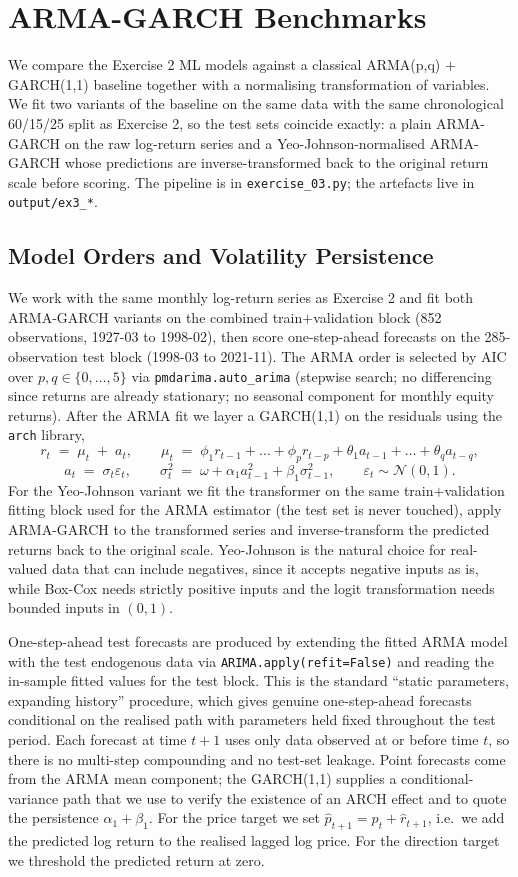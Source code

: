 \documentclass[12pt,a4paper]{article}
\newcommand{\probsection}[2]{\section{#2}}
\newcommand{\probsub}[2]{\subsection{#2}}
\newcommand{\code}[1]{\texttt{#1}}
\begin{document}
\probsection{3}{ARMA-GARCH Benchmarks}

We compare the Exercise 2 ML models against a classical ARMA(p,q) $+$ GARCH(1,1) baseline together with a normalising transformation of variables. We fit two variants of the baseline on the same data with the same chronological 60/15/25 split as Exercise 2, so the test sets coincide exactly: a plain ARMA-GARCH on the raw log-return series and a Yeo-Johnson-normalised ARMA-GARCH whose predictions are inverse-transformed back to the original return scale before scoring. The pipeline is in \code{exercise\_03.py}; the artefacts live in \code{output/ex3\_*}.

\probsub{3a}{Model Orders and Volatility Persistence}

We work with the same monthly log-return series as Exercise 2 and fit both ARMA-GARCH variants on the combined train$+$validation block (852 observations, 1927-03 to 1998-02), then score one-step-ahead forecasts on the 285-observation test block (1998-03 to 2021-11). The ARMA order is selected by AIC over $p, q \in \{0, \dots, 5\}$ via \code{pmdarima.auto\_arima} (stepwise search; no differencing since returns are already stationary; no seasonal component for monthly equity returns). After the ARMA fit we layer a GARCH(1,1) on the residuals using the \code{arch} library,
\[
r_t \;=\; \mu_t \;+\; a_t,\qquad
\mu_t \;=\; \phi_1 r_{t-1} + \dots + \phi_p r_{t-p} + \theta_1 a_{t-1} + \dots + \theta_q a_{t-q},
\]
\[
a_t \;=\; \sigma_t \varepsilon_t,\qquad
\sigma_t^2 \;=\; \omega + \alpha_1 a_{t-1}^2 + \beta_1 \sigma_{t-1}^2,\qquad \varepsilon_t \sim \mathcal{N}(0, 1).
\]
For the Yeo-Johnson variant we fit the transformer on the same train$+$validation fitting block used for the ARMA estimator (the test set is never touched), apply ARMA-GARCH to the transformed series and inverse-transform the predicted returns back to the original scale. Yeo-Johnson is the natural choice for real-valued data that can include negatives, since it accepts negative inputs as is, while Box-Cox needs strictly positive inputs and the logit transformation needs bounded inputs in $(0,1)$.

One-step-ahead test forecasts are produced by extending the fitted ARMA model with the test endogenous data via \code{ARIMA.apply(refit=False)} and reading the in-sample fitted values for the test block. This is the standard ``static parameters, expanding history'' procedure, which gives genuine one-step-ahead forecasts conditional on the realised path with parameters held fixed throughout the test period. Each forecast at time $t+1$ uses only data observed at or before time $t$, so there is no multi-step compounding and no test-set leakage. Point forecasts come from the ARMA mean component; the GARCH(1,1) supplies a conditional-variance path that we use to verify the existence of an ARCH effect and to quote the persistence $\alpha_1 + \beta_1$. For the price target we set $\widehat{p}_{t+1} = p_t + \widehat{r}_{t+1}$, i.e.\ we add the predicted log return to the realised lagged log price. For the direction target we threshold the predicted return at zero.
\end{document}
